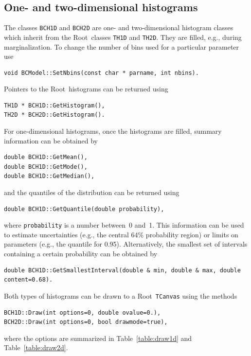 \documentclass[11pt, a4paper]{article}
\newcommand{\Root}{{\sc Root}}
\begin{document}
\subsection{One- and two-dimensional histograms}

The classes \verb|BCH1D| and \verb|BCH2D| are one- and two-dimensional
histogram classes which inherit from the \Root\ classes \verb|TH1D|
and \verb|TH2D|. They are filled, e.g., during marginalization. To
change the number of bins used for a particular parameter use
%
\begin{verbatim}
void BCModel::SetNbins(const char * parname, int nbins).
\end{verbatim}
%
Pointers to the \Root\ histograms can be returned
using
%
\begin{verbatim}
TH1D * BCH1D::GetHistogram(),
TH2D * BCH2D::GetHistogram().
\end{verbatim}
%
For one-dimensional histograms, once the histograms are filled,
summary information can be obtained by
%
\begin{verbatim}
double BCH1D::GetMean(),
double BCH1D::GetMode(),
double BCH1D::GetMedian(),
\end{verbatim}
%
and the quantiles of the distribution can be returned using
%
\begin{verbatim}
double BCH1D::GetQuantile(double probability),
\end{verbatim}
%
where \verb|probability| is a number between~0 and~1. This information
can be used to estimate uncertainties (e.g., the central 64\%
probability region) or limits on parameters (e.g., the quantile for
0.95). Alternatively, the smallest set of intervals containing a
certain probability can be obtained by
%
\begin{verbatim}
double BCH1D::GetSmallestInterval(double & min, double & max, double content=0.68).
\end{verbatim}

Both types of histograms can be drawn to a \Root\ \verb|TCanvas| using
the methods
%
\begin{verbatim}
BCH1D::Draw(int options=0, double ovalue=0.),
BCH2D::Draw(int options=0, bool drawmode=true),
\end{verbatim}
%
where the options are summarized in Table~\ref{table:draw1d} and
Table~\ref{table:draw2d}.
\end{document}
